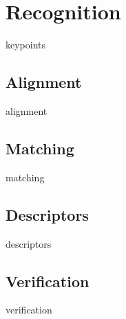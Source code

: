 
\chapter{Recognition}
\label{cha:recognition}

keypoints


\section{Alignment}
\label{sec:alignment}

alignment


\section{Matching}
\label{sec:matching}

matching


\section{Descriptors}
\label{sec:descriptors}

descriptors


\section{Verification}
\label{sec:verification}

verification